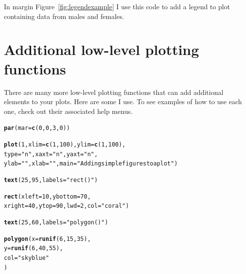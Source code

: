 \documentclass{tufte-book}\usepackage[]{graphicx}\usepackage[]{color}
\makeatletter
\newcommand{\hlnum}[1]{\textcolor[rgb]{0.686,0.059,0.569}{#1}}%
\newcommand{\hlstr}[1]{\textcolor[rgb]{0.192,0.494,0.8}{#1}}%
\newcommand{\hlstd}[1]{\textcolor[rgb]{0.345,0.345,0.345}{#1}}%
\newcommand{\hlkwc}[1]{\textcolor[rgb]{0.333,0.667,0.333}{#1}}%
\newcommand{\hlkwd}[1]{\textcolor[rgb]{0.737,0.353,0.396}{\textbf{#1}}}%
\newenvironment{kframe}{%
 \def\at@end@of@kframe{}%
 \ifinner\ifhmode%
  \def\at@end@of@kframe{\end{minipage}}%
  \begin{minipage}{\columnwidth}%
 \fi\fi%
 \def\FrameCommand##1{\hskip\@totalleftmargin \hskip-\fboxsep
 \colorbox{shadecolor}{##1}\hskip-\fboxsep
     \hskip-\linewidth \hskip-\@totalleftmargin \hskip\columnwidth}%
 \MakeFramed {\advance\hsize-\width
   \@totalleftmargin\z@ \linewidth\hsize
   \@setminipage}}%
 {\par\unskip\endMakeFramed%
 \at@end@of@kframe}
\newenvironment{knitrout}{}{} %
\makeatother
\begin{document}
\begin{footnotesize}
In margin Figure~\ref{fig:legendexample} I use this code to add a legend to plot containing data from males and females.



\section{Additional low-level plotting functions}

There are many more low-level plotting functions that can add additional elements to your plots. Here are some I use. To see examples of how to use each one, check out their associated help menus.



\begin{marginfigure}
\begin{tiny}
\begin{knitrout}
\color{fgcolor}\begin{kframe}
\begin{alltt}
\hlkwd{par}\hlstd{(}\hlkwc{mar} \hlstd{=} \hlkwd{c}\hlstd{(}\hlnum{0}\hlstd{,} \hlnum{0}\hlstd{,} \hlnum{3}\hlstd{,} \hlnum{0}\hlstd{))}

\hlkwd{plot}\hlstd{(}\hlnum{1}\hlstd{,} \hlkwc{xlim} \hlstd{=} \hlkwd{c}\hlstd{(}\hlnum{1}\hlstd{,} \hlnum{100}\hlstd{),} \hlkwc{ylim} \hlstd{=} \hlkwd{c}\hlstd{(}\hlnum{1}\hlstd{,} \hlnum{100}\hlstd{),}
     \hlkwc{type} \hlstd{=} \hlstr{"n"}\hlstd{,} \hlkwc{xaxt} \hlstd{=} \hlstr{"n"}\hlstd{,} \hlkwc{yaxt} \hlstd{=} \hlstr{"n"}\hlstd{,}
     \hlkwc{ylab} \hlstd{=} \hlstr{""}\hlstd{,} \hlkwc{xlab} \hlstd{=} \hlstr{""}\hlstd{,} \hlkwc{main} \hlstd{=} \hlstr{"Adding simple figures to a plot"}\hlstd{)}

\hlkwd{text}\hlstd{(}\hlnum{25}\hlstd{,} \hlnum{95}\hlstd{,} \hlkwc{labels} \hlstd{=} \hlstr{"rect()"}\hlstd{)}

\hlkwd{rect}\hlstd{(}\hlkwc{xleft} \hlstd{=} \hlnum{10}\hlstd{,} \hlkwc{ybottom} \hlstd{=} \hlnum{70}\hlstd{,}
     \hlkwc{xright} \hlstd{=} \hlnum{40}\hlstd{,} \hlkwc{ytop} \hlstd{=} \hlnum{90}\hlstd{,} \hlkwc{lwd} \hlstd{=} \hlnum{2}\hlstd{,} \hlkwc{col} \hlstd{=} \hlstr{"coral"}\hlstd{)}

\hlkwd{text}\hlstd{(}\hlnum{25}\hlstd{,} \hlnum{60}\hlstd{,} \hlkwc{labels} \hlstd{=} \hlstr{"polygon()"}\hlstd{)}

\hlkwd{polygon}\hlstd{(}\hlkwc{x} \hlstd{=} \hlkwd{runif}\hlstd{(}\hlnum{6}\hlstd{,} \hlnum{15}\hlstd{,} \hlnum{35}\hlstd{),}
        \hlkwc{y} \hlstd{=} \hlkwd{runif}\hlstd{(}\hlnum{6}\hlstd{,} \hlnum{40}\hlstd{,} \hlnum{55}\hlstd{),}
        \hlkwc{col} \hlstd{=} \hlstr{"skyblue"}
        \hlstd{)}



\end{alltt}
\end{kframe}
\end{knitrout}
\end{tiny}
\end{marginfigure}
\end{footnotesize}
\end{document}

